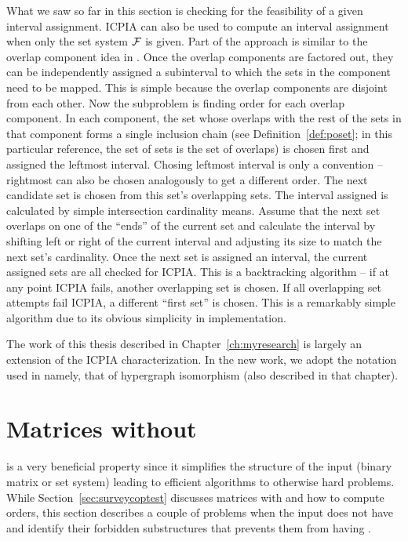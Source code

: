 What we saw so far in this section is checking for the feasibility of
a given interval assignment. ICPIA can also be used to compute an
interval assignment when only the set system ${\cal F}$ is given. Part of
the approach is similar to the overlap component idea in \cite{fg65,
  wlh02}. Once the overlap components are factored out, they can be
independently assigned a subinterval to which the sets in the
component need to be mapped. This is simple because the overlap
components are disjoint from each other. Now the subproblem is finding
\COP order for each overlap component. In each component, the set
whose overlaps with the rest of the sets in that component forms a
single inclusion chain (see Definition~\ref{def:poset}; in this
particular reference, the set of sets is the set of overlaps) is
chosen first and assigned the leftmost interval. Chosing leftmost
interval is only a convention -- rightmost can also be chosen
analogously to get a different \COP order. The next candidate set is
chosen from this set's overlapping sets. The interval assigned is
calculated by simple intersection cardinality means. Assume that the
next set overlaps on one of the ``ends'' of the current set and
calculate the interval by shifting left or right of the current
interval and adjusting its size to match the next set's
cardinality. Once the next set is assigned an interval, the current
assigned sets are all checked for ICPIA. This is a backtracking
algorithm -- if at any point ICPIA fails, another overlapping set is
chosen. If all overlapping set attempts fail ICPIA, a different
``first set'' is chosen. This is a remarkably simple algorithm due to
its obvious simplicity in implementation.

The work of this thesis described in Chapter~\ref{ch:myresearch} is
largely an extension of the ICPIA characterization. In the new work,
we adopt the notation used in \cite{kklv10} namely, that of hypergraph
isomorphism (also described in that chapter). 



\section{Matrices without \COP}
\label{sec:surveycopopt}

\COP is a very beneficial property since it simplifies the structure
of the input (binary matrix or set system) leading to
efficient algorithms to otherwise hard problems.  While
Section~\ref{sec:surveycoptest} discusses matrices with \COP and how
to compute \COP orders, this section describes a couple of problems
when the input does not have \COP and identify their forbidden
substructures that prevents them from having \COP.

